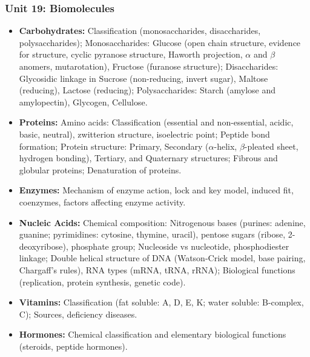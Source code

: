 \documentclass[11pt,a4paper]{article}
\begin{document}
\subsubsection{Unit 19: Biomolecules}
\begin{itemize}
  \item \textbf{Carbohydrates:} Classification (monosaccharides, disaccharides, polysaccharides); Monosaccharides: Glucose (open chain structure, evidence for structure, cyclic pyranose structure, Haworth projection, $\alpha$ and $\beta$ anomers, mutarotation), Fructose (furanose structure); Disaccharides: Glycosidic linkage in Sucrose (non-reducing, invert sugar), Maltose (reducing), Lactose (reducing); Polysaccharides: Starch (amylose and amylopectin), Glycogen, Cellulose.
  \item \textbf{Proteins:} Amino acids: Classification (essential and non-essential, acidic, basic, neutral), zwitterion structure, isoelectric point; Peptide bond formation; Protein structure: Primary, Secondary ($\alpha$-helix, $\beta$-pleated sheet, hydrogen bonding), Tertiary, and Quaternary structures; Fibrous and globular proteins; Denaturation of proteins.
  \item \textbf{Enzymes:} Mechanism of enzyme action, lock and key model, induced fit, coenzymes, factors affecting enzyme activity.
  \item \textbf{Nucleic Acids:} Chemical composition: Nitrogenous bases (purines: adenine, guanine; pyrimidines: cytosine, thymine, uracil), pentose sugars (ribose, 2-deoxyribose), phosphate group; Nucleoside vs nucleotide, phosphodiester linkage; Double helical structure of DNA (Watson-Crick model, base pairing, Chargaff's rules), RNA types (mRNA, tRNA, rRNA); Biological functions (replication, protein synthesis, genetic code).
  \item \textbf{Vitamins:} Classification (fat soluble: A, D, E, K; water soluble: B-complex, C); Sources, deficiency diseases.
  \item \textbf{Hormones:} Chemical classification and elementary biological functions (steroids, peptide hormones).
\end{itemize}
\end{document}
